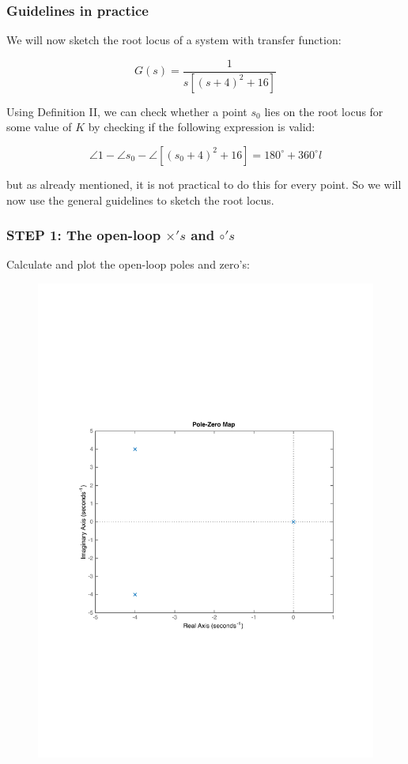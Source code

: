 \begin{frame}
\frametitle{Guidelines in practice}
\justify
	We will now sketch the root locus of a system with transfer function:\\
	\begin{exampleblock}{}
		\begin{equation}
		G(s) = \frac{1}{s[(s+4)^{2} + 16]}
		\end{equation}
	\end{exampleblock}
	Using Definition II, we can check whether a point $s_0$ lies on the root locus for some value of $K$ by checking if the following expression is valid: 
	\begin{exampleblock}{}
		\begin{equation}
		\angle 1 - \angle s_0 -\angle [(s_0 + 4)^2 + 16] = 180^{\circ} + 360^{\circ}l
		\end{equation}
	\end{exampleblock}
	but as already mentioned, it is not practical to do this for every point. So we will now use the general guidelines to sketch the root locus. 
\end{frame}	

\begin{frame}
\frametitle{STEP 1: The open-loop $\times's$ and $\circ's$}
	Calculate and plot the open-loop poles and zero's:
	\begin{exampleblock}{}
		\begin{figure}
			\centering
			\includegraphics[width=0.6\linewidth]{how_to_draw_ex1}
		\end{figure}
	\end{exampleblock}
\end{frame}


